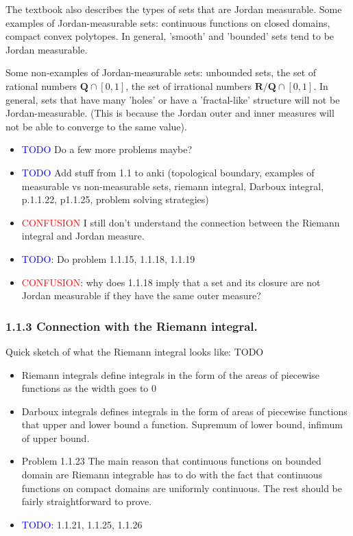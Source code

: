 \documentclass[answers,12pt]{exam}
\begin{document}
The textbook also describes the types of sets that are Jordan measurable.
Some examples of Jordan-measurable sets: continuous functions on closed domains, compact convex polytopes.
In general, 'smooth' and 'bounded' sets tend to be Jordan measurable.

Some non-examples of Jordan-measurable sets: unbounded sets, the set of rational numbers $\mathbf{Q} \cap [0,1]$, the set of irrational numbers $\mathbf{R/Q} \cap [0,1]$.
In general, sets that have many 'holes' or have a 'fractal-like' structure will not be Jordan-measurable.
(This is because the Jordan outer and inner measures will not be able to converge to the same value).

\begin{itemize}
    \item \textcolor{blue}{TODO} Do a few more problems maybe?
    \item \textcolor{blue}{TODO} Add stuff from 1.1 to anki (topological boundary, examples of measurable vs non-measurable sets, riemann integral, Darboux integral, p.1.1.22, p1.1.25, problem solving strategies)
    \item \textcolor{red}{CONFUSION} I still don't understand the connection between the Riemann integral and Jordan measure.
    \item \textcolor{blue}{TODO}: Do problem 1.1.15, 1.1.18, 1.1.19
    \item \textcolor{red}{CONFUSION}: why does 1.1.18 imply that a set and its closure are not Jordan measurable if they have the same outer measure?
\end{itemize}

\subsubsection{1.1.3 Connection with the Riemann integral.}
Quick sketch of what the Riemann integral looks like: TODO
\begin{itemize}
    \item Riemann integrals define integrals in the form of the areas of piecewise functions as the width goes to 0
    \item Darboux integrals defines integrals in the form of areas of piecewise functions that upper and lower bound a function.
    Supremum of lower bound, infimum of upper bound.
    \item Problem 1.1.23 The main reason that continuous functions on bounded domain are Riemann integrable has to do with the fact that continuous functions on compact domains are uniformly continuous.
    The rest should be fairly straightforward to prove.
    \item \textcolor{blue}{TODO}: 1.1.21, 1.1.25, 1.1.26  
\end{itemize}
\end{document}
